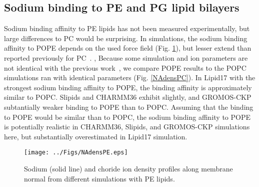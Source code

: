 \documentclass[journal=jpcbfk]{achemso}
\begin{document}
\subsection{Sodium binding to PE and PG lipid bilayers}
Sodium binding affinity to PE lipids has not been measured experimentally,
but large differences to PC would be surprising. 
In simulations, the sodium binding affinity to POPE depends on the used force field (Fig. \ref{NAdensPE}),
but lesser extend than reported previously for PC~\cite{catte16}.
,
Because some simulation and ion parameters are not identical with the previous work~\cite{catte16},
we compare POPE results to the POPC simulations ran with identical parameters (Fig. \ref{NAdensPC}).
In Lipid17 with the strongest sodium binding affinity to POPE,
the binding affinity is approximately similar to POPC.
Slipids and CHARMM36 exhibit slightly, and
GROMOS-CKP subtantially weaker binding to POPE than to POPC.
Assuming that the binding
to POPE would be similar than to POPC, the sodium binding affinity to POPE
is potentially realistic in CHARMM36, Slipids, and GROMOS-CKP simulations here,
but substantially overestimated in Lipid17 simulation.
\begin{figure}[]
  \centering
  \texttt{[image: ../Figs/NAdensPE.eps]}
  \caption{\label{NAdensPE}
    Sodium (solid line) and choride ion density profiles along membrane normal
    from different simulations with PE lipids.
  }
\end{figure}
\end{document}
